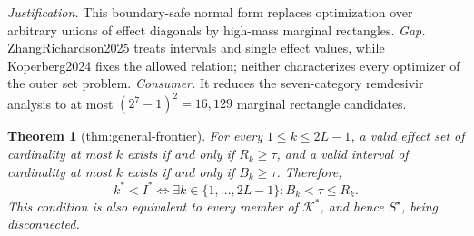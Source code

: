 \documentclass{article}
\newtheorem{theorem}{Theorem}
\begin{document}
\par\smallskip\noindent \textit{Justification.} This boundary-safe normal form replaces optimization over arbitrary unions of effect diagonals by high-mass marginal rectangles. \textit{Gap.} ZhangRichardson2025 treats intervals and single effect values, while Koperberg2024 fixes the allowed relation; neither characterizes every optimizer of the outer set problem. \textit{Consumer.} It reduces the seven-category remdesivir analysis to at most \((2^7-1)^2=16{,}129\) marginal rectangle candidates.

\begin{theorem}[thm:general-frontier]\label{thm:general-frontier}
For every \(1\leq k\leq2L-1\), a valid effect set of cardinality at most \(k\) exists if and only if \(R_k\geq\tau\), and a valid interval of cardinality at most \(k\) exists if and only if \(B_k\geq\tau\). Therefore, \[k^*<I^*\iff\exists k\in\{1,\ldots,2L-1\}:B_k<\tau\leq R_k.\] This condition is also equivalent to every member of \(\mathcal K^*\), and hence \(S^\star\), being disconnected.
\end{theorem}
\end{document}
